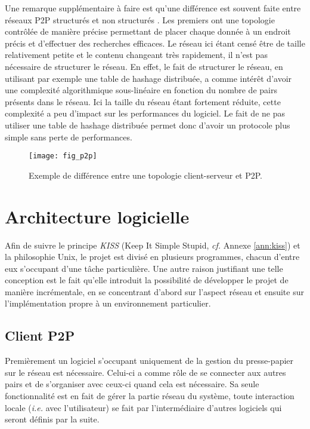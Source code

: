 Une remarque supplémentaire à faire est qu'une différence est souvent faite
entre réseaux P2P structurés et non structurés \cite{AS04, Lua05asurvey}.
Les premiers ont une topologie contrôlée de manière précise permettant
de placer chaque donnée à un endroit précis et d'effectuer des recherches
efficaces. Le réseau ici étant censé être de taille relativement petite
et le contenu changeant très rapidement, il n'est pas nécessaire de structurer
le réseau. En effet, le fait de structurer le réseau, en utilisant par exemple
une table de hashage distribuée, a comme intérêt d'avoir une complexité
algorithmique sous-linéaire en fonction du nombre de pairs présents dans
le réseau. Ici la taille du réseau étant fortement réduite, cette
complexité a peu d'impact sur les performances du logiciel. Le fait de ne
pas utiliser une table de hashage distribuée permet donc d'avoir un protocole
plus simple sans perte de performances.

\begin{figure}[!h]
  \centering
  \texttt{[image: fig\_p2p]}
  \caption{Exemple de différence entre une topologie client-serveur et P2P.}
  \label{fig:p2p}
\end{figure}

\section{Architecture logicielle}
Afin de suivre le principe \emph{KISS} (Keep It Simple Stupid, \emph{cf.}
Annexe \ref{ann:kiss}) et la philosophie Unix, le projet est divisé en
plusieurs programmes, chacun d'entre eux s'occupant d'une tâche particulière.
Une autre raison justifiant une telle conception est le fait qu'elle introduit
la possibilité de développer le projet de manière incrémentale, en se
concentrant d'abord sur l'aspect réseau et ensuite sur l'implémentation
propre à un environnement particulier.

\subsection{Client P2P}
Premièrement un logiciel s'occupant uniquement de la gestion du presse-papier
sur le réseau est nécessaire. Celui-ci a comme rôle de se connecter aux
autres pairs et de s'organiser avec ceux-ci quand cela est nécessaire.
Sa seule fonctionnalité est en fait de gérer la partie réseau du système,
toute interaction locale (\emph{i.e.} avec l'utilisateur) se fait par
l'intermédiaire d'autres logiciels qui seront définis par la suite.

